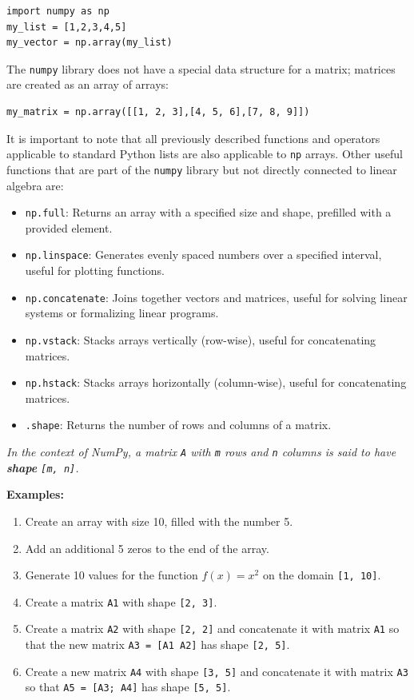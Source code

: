 \documentclass[11pt]{article}
\providecommand{\tightlist}{%
      \setlength{\itemsep}{0pt}\setlength{\parskip}{0pt}}
\begin{document}
\begin{verbatim}
import numpy as np
my_list = [1,2,3,4,5]
my_vector = np.array(my_list)
\end{verbatim}

The \texttt{numpy} library does not have a special data structure for a
matrix; matrices are created as an array of arrays:

\begin{verbatim}
my_matrix = np.array([[1, 2, 3],[4, 5, 6],[7, 8, 9]])
\end{verbatim}

It is important to note that all previously described functions and
operators applicable to standard Python lists are also applicable to
\texttt{np} arrays. Other useful functions that are part of the
\texttt{numpy} library but not directly connected to linear algebra are:

\begin{itemize}
\tightlist
\item
  \texttt{np.full}: Returns an array with a specified size and shape,
  prefilled with a provided element.
\item
  \texttt{np.linspace}: Generates evenly spaced numbers over a specified
  interval, useful for plotting functions.
\item
  \texttt{np.concatenate}: Joins together vectors and matrices, useful
  for solving linear systems or formalizing linear programs.
\item
  \texttt{np.vstack}: Stacks arrays vertically (row-wise), useful for
  concatenating matrices.
\item
  \texttt{np.hstack}: Stacks arrays horizontally (column-wise), useful
  for concatenating matrices.
\item
  \texttt{.shape}: Returns the number of rows and columns of a matrix.
\end{itemize}

\emph{In the context of NumPy, a matrix \texttt{A} with \texttt{m} rows
and \texttt{n} columns is said to have \textbf{shape}
\texttt{{[}m,\ n{]}}.}

\textbf{Examples:}

\begin{enumerate}
\def\labelenumi{\arabic{enumi}.}
\item
  Create an array with size 10, filled with the number 5.
\item
  Add an additional 5 zeros to the end of the array.
\item
  Generate 10 values for the function \(f(x)=x^2\) on the domain
  \texttt{{[}1,\ 10{]}}.
\item
  Create a matrix \texttt{A1} with shape \texttt{{[}2,\ 3{]}}.
\item
  Create a matrix \texttt{A2} with shape \texttt{{[}2,\ 2{]}} and
  concatenate it with matrix \texttt{A1} so that the new matrix
  \texttt{A3\ =\ {[}A1\ A2{]}} has shape \texttt{{[}2,\ 5{]}}.
\item
  Create a new matrix \texttt{A4} with shape \texttt{{[}3,\ 5{]}} and
  concatenate it with matrix \texttt{A3} so that
  \texttt{A5\ =\ {[}A3;\ A4{]}} has shape \texttt{{[}5,\ 5{]}}.
\end{enumerate}
\end{document}
